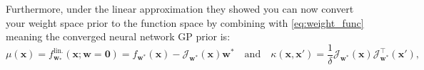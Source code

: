 \documentclass{article}
\makeatletter
\newcommand{\ie}{\textit{i.e.\@}\xspace}
\newcommand{\weights}{\ensuremath{\mathbf{w}}}
\newcommand{\mbf}[1]{\mathbf{#1}}
\newcommand{\vzeros}{\mbf{0}}
\newcommand{\vx}{\mbf{x}}
\newcommand{\vw}{\mbf{w}}
\newcommand{\Jac}[2]{\mathcal{J}_{#1}(#2)}
\newcommand{\JacT}[2]{\mathcal{J}_{#1}^\top(#2)}
\newcommand{\GP}{\mathcal{GP}}
\makeatother
\begin{document}
Furthermore, under the linear approximation they showed you can now convert your weight space prior to the function space by combining with \cref{eq:weight_func} meaning the converged neural network GP prior is:
\begin{equation} \label{eq-laplace-approx-function-space}
  \mu(\vx) =  f^{\textrm{lin.}}_{\vw_*}(\vx; \vw = \vzeros) = f_{\vw^*}(\vx) - \Jac{\weights^*}{\mathbf{x}} \vw^* \quad \text{and} \quad
  \kappa(\mathbf{x}, \mathbf{x}')
  = \frac{1}{\delta} \Jac{\weights^*}{\mathbf{x}}\JacT{\weights^*}{\mathbf{x}'},
\end{equation}
%
\end{document}
